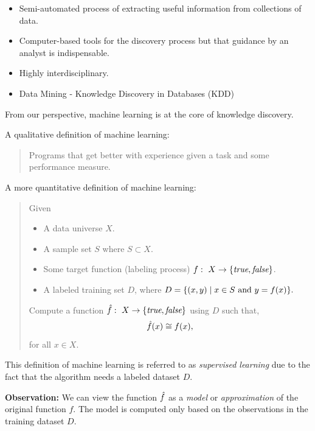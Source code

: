 \documentclass[a4paper,blends,pdf,colorBG,slideColor]{prosper}
\begin{document}
\begin{itemize}
\item Semi-automated process of extracting useful information from collections of data.
\item Computer-based tools for the discovery process but that
guidance by an analyst is indispensable.
\item Highly interdisciplinary.
\item Data Mining - Knowledge Discovery in Databases (KDD)
\end{itemize}
\es


From our perspective, machine learning is at the core of knowledge discovery.

A qualitative definition of machine learning:

\begin{quote}
Programs that get better with experience given a task and some performance measure.
\end{quote}
\es



A more quantitative definition of machine learning:
\begin{quote}

Given
\begin{itemize}
\item A data universe $X$.
\item A sample set $S$ where $S \subset X$.
\item Some target function (labeling process) $f\,\colon\; X \rightarrow \{\text{\it true}, \text{\it false}\}$.
\item A labeled training set $D$, where
$
D = \{ (x ,y) \mid x \in S \text{ and } y = f(x)\}.
$
\end{itemize}
Compute a function $\hat{f}\,\colon\; X \rightarrow \{ \text{\it true}, \text{\it false}\}$ using $D$ such that,
\begin{equation*}
\label{eq:process-model}
\hat{f}(x) \cong f(x),
\end{equation*}
for all $x \in X$.
\end{quote}

This definition of machine learning is referred to as {\em supervised learning}
due to the fact that the algorithm needs a labeled dataset $D$.

{\bf Observation:} We can view the function $\hat{f}$ as a {\em model} or {\em approximation}
of the original function $f$.  The model is computed only based on the 
observations in the training dataset $D$.
\es
\end{document}
